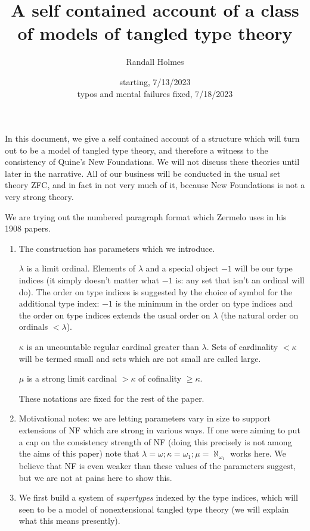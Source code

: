 \documentclass[12pt]{article}
\title{A self contained account of a class of models of tangled type theory}
\author{Randall Holmes}
\date{starting, 7/13/2023\\
typos and mental failures fixed, 7/18/2023}
\begin{document}
\maketitle

In this document, we give a self contained account of a structure which will turn out to be a model of tangled type theory, and therefore a witness to the consistency of Quine's New Foundations.
We will not discuss these theories until later in the narrative.  All of our business will be conducted in the usual set theory ZFC, and in fact in not very much of it, because New Foundations is not a very strong theory.

We are trying out the numbered paragraph format which Zermelo uses in his 1908 papers.

\begin{enumerate}

\item The construction has parameters which we introduce.

$\lambda$ is a limit ordinal.  Elements of $\lambda$ and a special object $-1$ will be our type indices (it simply doesn't matter what $-1$ is:  any set that isn't an ordinal will do).  The order on type indices is suggested by the choice of symbol for the additional type index:  $-1$ is the minimum in the order on type indices and the order on type indices extends the usual order on $\lambda$ (the natural order on ordinals $<\lambda$).

$\kappa$ is an uncountable regular cardinal greater than $\lambda$.  Sets of cardinality $<\kappa$ will be termed small and sets which are not small are called large.

$\mu$ is a strong limit cardinal $>\kappa$ of cofinality $\geq \kappa$.

These notations are fixed for the rest of the paper.

\item  Motivational notes:  we are letting parameters vary in size to support extensions of NF which are strong in various ways.  If one were aiming to put a cap on the consistency strength of NF (doing this precisely is not among the aims of this paper) note that $\lambda = \omega; \kappa = \omega_1; \mu = \aleph_{\omega_1}$ works here.  We believe that NF is even weaker than these values of the parameters suggest, but we are not at pains here to show this.

\item We first build a system of {\em supertypes\/} indexed by the type indices, which will seen to be a model of nonextensional tangled type theory (we will explain what this means presently).


\end{enumerate}
\end{document}
